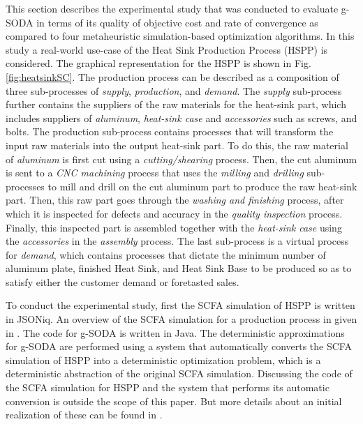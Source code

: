 \documentclass[a4paper, 12pt]{article} %
\begin{document}
This section describes the experimental study that was conducted to evaluate g-SODA in terms of its quality of objective cost and rate of convergence as compared to four metaheuristic simulation-based optimization algorithms. 
In this study a real-world use-case of the Heat Sink Production Process (HSPP) is considered.
The graphical representation for the HSPP  is shown in Fig. \ref{fig:heatsinkSC}.
The production process can be described as a composition of three sub-processes of \textit{supply}, \textit{production}, and \textit{demand}. 
The \textit{supply} sub-process further contains the suppliers of the raw materials for the heat-sink part, which includes suppliers of \textit{aluminum}, \textit{heat-sink case} and \textit{accessories} such as screws, and bolts. 
The production sub-process contains processes that will transform the input raw materials into the output heat-sink part. 
To do this, the raw material of \textit{aluminum} is first cut using a \textit{cutting/shearing} process. Then, the cut aluminum is sent to a \textit{CNC machining} process that uses the \textit{milling} and \textit{drilling} sub-processes to mill and drill on the cut aluminum part to produce the raw heat-sink part. Then, this raw part goes through the \textit{washing and finishing} process, after which it is inspected for defects and accuracy in the \textit{quality inspection} process. Finally, this inspected part is assembled together with the \textit{heat-sink case} using the \textit{accessories} in the \textit{assembly} process.
The last sub-process is a virtual process for \textit{demand}, which contains processes that dictate the minimum number of aluminum plate, finished Heat Sink, and Heat Sink Base to be produced so as to satisfy either the customer demand or foretasted sales. 


To conduct the experimental study, first the SCFA simulation of HSPP is written in JSONiq. An overview of the SCFA simulation for a production process in given in \cite{GMU-CS-TR-2017-3}.  The code for g-SODA is written in Java. The deterministic approximations for g-SODA are performed using a system that automatically converts the SCFA simulation of HSPP into a deterministic optimization problem, which is a deterministic abstraction of the original SCFA simulation. Discussing the code of the SCFA simulation for HSPP and the system that performs its automatic conversion is outside the scope of this paper. But more details about an initial realization of these can be found in \cite{Brodsky2016ieeebd,Brodsky2017ieeebd}.
\end{document}
